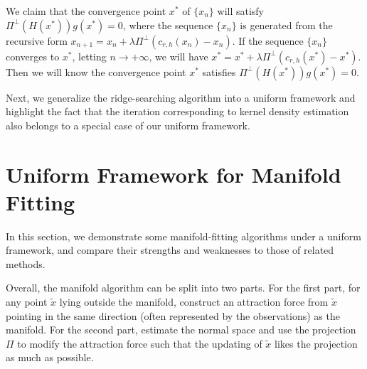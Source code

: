 \documentclass[aos,preprint]{imsart}
\theoremstyle{remark}
\begin{document}
We claim that the convergence point $x^*$ of $\{x_n\}$ will satisfy $\Pi^{\perp}(H(x^*)) g(x^*)=0$, where the sequence $\{x_n\}$ is generated from the recursive form $x_{n+1} = x_n + \lambda \Pi^\perp (c_{r,h}(x_n) - x_n)$. If the sequence $\{x_n\}$ converges to $x^*$, letting $n\rightarrow +\infty$, we will have $x^* = x^* + \lambda \Pi^\perp (c_{r,h}(x^*) - x^*)$. Then we will know the convergence point $x^*$ satisfies $\Pi^{\perp}(H(x^*)) g(x^*)=0$.



Next, we generalize the ridge-searching algorithm into a uniform framework and highlight the fact that the iteration corresponding to kernel density estimation also belongs to a special case of our uniform framework.


\section{Uniform Framework for Manifold Fitting}

In this section, we demonstrate some manifold-fitting algorithms under a uniform framework, and compare their strengths and weaknesses to those of related methods.

Overall, the manifold algorithm can be split into two parts. For the first part, for any point $\tilde{x}$ lying outside the manifold, construct an attraction force from $\tilde{x}$ pointing in the same direction (often represented by the observations) as the manifold. For the second part, estimate the normal space and use the projection $\Pi$ to modify the attraction force such that the updating of $\tilde{x}$ likes the projection as much as possible.


\end{document}
